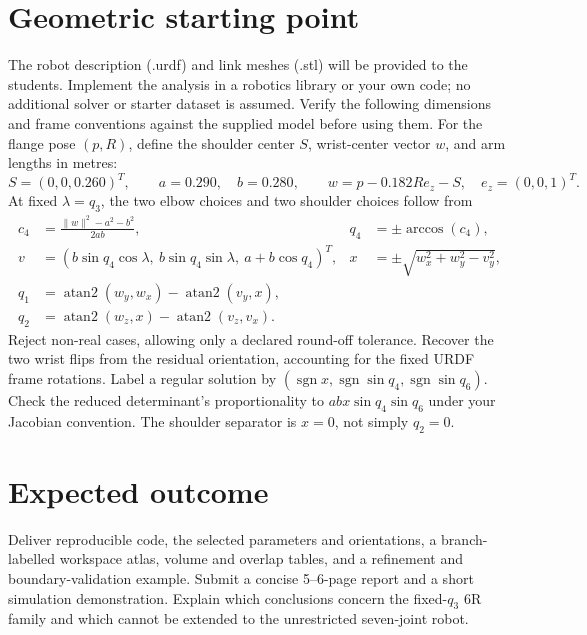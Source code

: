 \documentclass[11pt,a4paper]{article}
\begin{document}
\section*{Geometric starting point}
The robot description (.urdf) and link meshes (.stl) will be provided to the
students. Implement the analysis in a robotics library or your own code;
no additional solver or starter dataset is assumed. Verify the following
dimensions and frame conventions against the supplied model before using them.
For the flange pose $(p,R)$, define the shoulder center $S$, wrist-center
vector $w$, and arm lengths in metres:
\[
S=(0,0,0.260)^T,\qquad a=0.290,\quad b=0.280,\qquad
w=p-0.182R e_z-S,\quad e_z=(0,0,1)^T.
\]
At fixed $\lambda=q_3$, the two elbow choices and two shoulder choices follow from
\[
\begin{aligned}
c_4&=\frac{\|w\|^2-a^2-b^2}{2ab}, &q_4&=\pm\arccos(c_4),\\
v&=(b\sin q_4\cos\lambda,\ b\sin q_4\sin\lambda,\ a+b\cos q_4)^T,
&x&=\pm\sqrt{w_x^2+w_y^2-v_y^2},\\
q_1&=\operatorname{atan2}(w_y,w_x)-\operatorname{atan2}(v_y,x),\\
q_2&=\operatorname{atan2}(w_z,x)-\operatorname{atan2}(v_z,v_x).
\end{aligned}
\]
Reject non-real cases, allowing only a declared round-off tolerance. Recover
the two wrist flips from the residual orientation, accounting for the fixed
URDF frame rotations. Label a regular solution by
$(\operatorname{sgn}x,\operatorname{sgn}\sin q_4,\operatorname{sgn}\sin q_6)$.
Check the reduced determinant's proportionality to
$abx\sin q_4\sin q_6$ under your Jacobian convention. The shoulder separator
is $x=0$, not simply $q_2=0$.

\section*{Expected outcome}
Deliver reproducible code, the selected parameters and orientations, a
branch-labelled workspace atlas, volume and overlap tables, and a refinement
and boundary-validation example. Submit a concise 5--6-page report and a short
simulation demonstration. Explain which conclusions concern the fixed-$q_3$
6R family and which cannot be extended to the unrestricted seven-joint robot.
\end{document}
